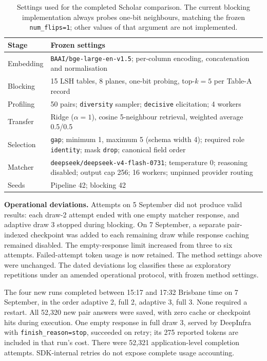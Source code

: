 \documentclass[11pt]{article}
\begin{document}
\begin{table}[H]
\centering\small
\begin{tabular}{p{}p{}}
\toprule
Stage & Frozen settings \\
\midrule
Embedding & \texttt{BAAI/bge-large-en-v1.5}; per-column encoding, concatenation and normalisation \\
Blocking & 15 LSH tables, 8 planes, one-bit probing, top-$k=5$ per Table-A record \\
Profiling & 50 pairs; \texttt{diversity} sampler; \texttt{decisive} elicitation; 4 workers \\
Transfer & Ridge ($\alpha=1$), cosine 5-neighbour retrieval, weighted average 0.5/0.5 \\
Selection & \texttt{gap}; minimum 1, maximum 5 (schema width 4); required role \texttt{identity}; mask \texttt{drop}; canonical field order \\
Matcher & \texttt{deepseek/deepseek-v4-flash-0731}; temperature 0; reasoning disabled; output cap 256; 16 workers; unpinned provider routing \\
Seeds & Pipeline 42; blocking 42 \\
\bottomrule
\end{tabular}
\caption{Settings used for the completed Scholar comparison. The current blocking
implementation always probes one-bit neighbours, matching the frozen
\texttt{num\_flips=1}; other values of that argument are not implemented.}
\end{table}

\textbf{Operational deviations.} Attempts on 5 September did not produce valid
results: each draw-2 attempt ended with one empty matcher response, and adaptive
draw 3 stopped during blocking. On 7 September, a separate pair-indexed checkpoint
was added to each remaining draw while response caching remained disabled.
The empty-response limit increased from three to six attempts. Failed-attempt
token usage is now retained. The method settings above were unchanged.
The dated deviations log classifies these as exploratory repetitions under an
amended operational protocol, with frozen method settings.

The four new runs completed between 15:17 and 17:32 Brisbane time on 7 September,
in the order adaptive 2, full 2, adaptive 3, full 3. None required a restart.
All 52,320 new pair answers were saved, with zero cache or checkpoint hits during
execution. One empty response in full draw 3, served by DeepInfra with
\texttt{finish\_reason=stop}, succeeded on retry; its 275 reported tokens are included
in that run's cost. There were 52,321 application-level completion attempts.
SDK-internal retries do not expose complete usage accounting.
\end{document}

